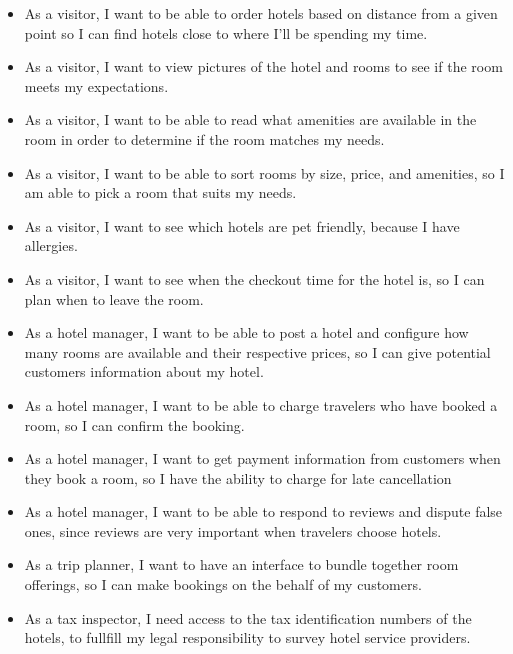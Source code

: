\documentclass{article}
\begin{document}
\begin{itemize}

\item As a visitor, I want to be able to order hotels based on distance from a given point so I can find hotels close to where I'll be spending my time.

\item As a visitor, I want to view pictures of the hotel and rooms to see if the room meets my expectations.

\item As a visitor, I want to be able to read what amenities are available in the room in order to determine if the room matches my needs.

\item As a visitor, I want to be able to sort rooms by size, price, and amenities, so I am able to pick a room that suits my needs.

\item As a visitor, I want to see which hotels are pet friendly, because I have allergies.

\item As a visitor, I want to see when the checkout time for the hotel is, so I can plan when to leave the room.

\item As a hotel manager, I want to be able to post a hotel and configure how many rooms are available and their respective prices, so I can give potential customers information about my hotel. 

\item As a hotel manager, I want to be able to charge travelers who have booked a room, so I can confirm the booking. 

\item As a hotel manager, I want to get payment information from customers when they book a room, so I have the ability to charge for late cancellation

\item As a hotel manager, I want to be able to respond to reviews and dispute false ones, since reviews are very important when travelers choose hotels.

\item As a trip planner, I want to have an interface to bundle together room offerings, so I can make bookings on the behalf of my customers.

\item As a tax inspector, I need access to the tax identification numbers of the hotels, to fullfill my legal responsibility to survey hotel service providers. 

\end{itemize}
\end{document}
